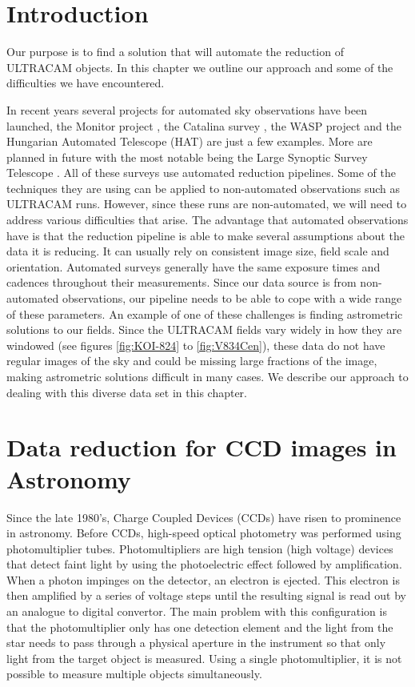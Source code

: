 \section{Introduction}
Our purpose is to find a solution that will automate the reduction of ULTRACAM objects. In this chapter we outline our approach and some of the difficulties we have encountered. 

In recent years several projects for automated sky observations have been launched, the Monitor project \citep{Irwin2007}, the Catalina survey \citep{Catalinacatalogue}, the WASP project \citep{PollaccoSuperWASP} and the Hungarian Automated Telescope (HAT) \citep{BakosHATNet} are just a few examples. More are planned in future with the most notable being the Large Synoptic Survey Telescope \citep{lsst}. All of these surveys use automated reduction pipelines. Some of the techniques they are using can be applied to non-automated observations such as ULTRACAM runs. However, since these runs are non-automated, we will need to address various difficulties that arise. The advantage that automated observations have is that the reduction pipeline is able to make several assumptions about the data it is reducing. It can usually rely on consistent image size, field scale and orientation. Automated surveys generally have the same exposure times and cadences throughout their measurements. Since our data source is from non-automated observations, our pipeline needs to be able to cope with a wide range of these parameters. An example of one of these challenges is finding astrometric solutions to our fields. Since the ULTRACAM fields vary widely in how they are windowed (see figures \ref{fig:KOI-824} to \ref{fig:V834Cen}), these data do not have regular images of the sky and could be missing large fractions of the image, making astrometric solutions difficult in many cases. We describe our approach to dealing with this diverse data set in this chapter. 

\section{Data reduction for CCD images in Astronomy}
Since the late 1980's, Charge Coupled Devices (CCDs) have risen to prominence in astronomy. Before CCDs, high-speed optical photometry was performed using photomultiplier tubes. Photomultipliers are high tension (high voltage) devices that detect faint light by using the photoelectric effect followed by amplification. When a photon impinges on the detector, an electron is ejected. This electron is then amplified by a series of voltage steps until the resulting signal is read out by an analogue to digital convertor. The main problem with this configuration is that the photomultiplier only has one detection element and the light from the star needs to pass through a physical aperture in the instrument so that only light from the target object is measured. Using a single photomultiplier, it is not possible to measure multiple objects simultaneously. 

